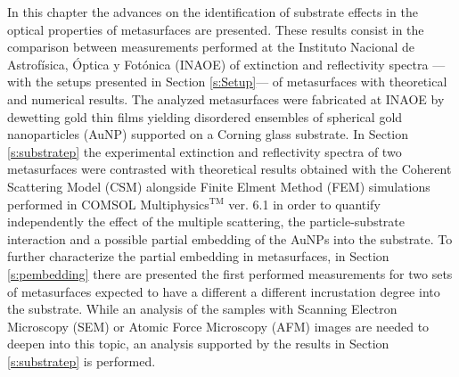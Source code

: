
In this chapter the advances on the identification of substrate effects in the optical properties of metasurfaces are presented. These results consist in the comparison between measurements performed at the Instituto Nacional de Astrofísica, Óptica y Fotónica (INAOE) of extinction and reflectivity spectra ---with the setups presented  in Section \ref{s:Setup}--- of metasurfaces  with theoretical and numerical results. The analyzed metasurfaces were fabricated at INAOE  by dewetting gold thin films yielding disordered ensembles of spherical gold nanoparticles (AuNP) supported on a Corning glass substrate. In Section \ref{s:substratep} the  experimental extinction and reflectivity spectra of two metasurfaces were contrasted  with theoretical results obtained with the Coherent Scattering Model (CSM) alongside Finite Elment Method (FEM) simulations performed in  COMSOL Multiphysics$^\text{TM}$ ver. 6.1 in order to quantify independently the effect of the multiple scattering,  the particle-substrate interaction and a possible partial embedding of the AuNPs into the substrate. To further characterize the partial embedding in metasurfaces, in Section \ref{s:pembedding} there are presented the first performed measurements for two sets of metasurfaces expected to have a different a different incrustation degree into the substrate. While an analysis of the samples with Scanning Electron Microscopy (SEM) or Atomic Force Microscopy (AFM) images are needed to deepen into this topic, an analysis supported by the results in Section \ref{s:substratep} is performed.



